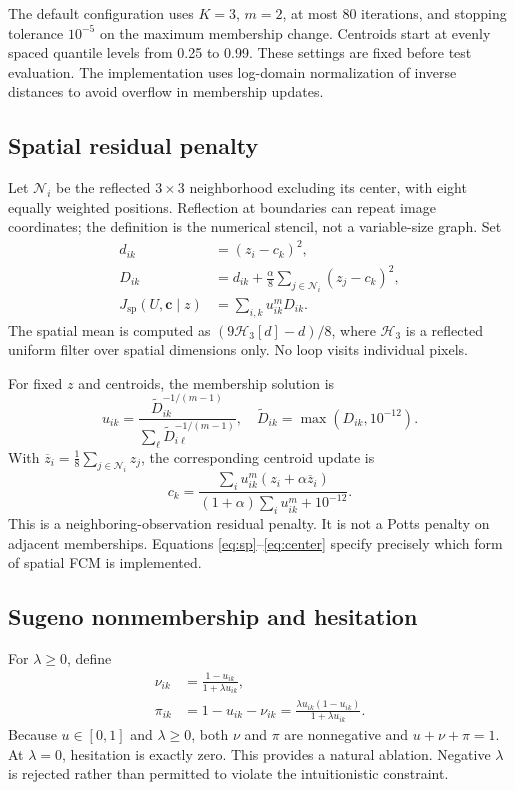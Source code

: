 \documentclass[conference]{IEEEtran}
\begin{document}
The default configuration uses $K=3$, $m=2$, at most 80 iterations, and stopping tolerance $10^{-5}$ on the maximum membership change. Centroids start at evenly spaced quantile levels from 0.25 to 0.99. These settings are fixed before test evaluation. The implementation uses log-domain normalization of inverse distances to avoid overflow in membership updates.

\subsection{Spatial residual penalty}
Let $\mathcal N_i$ be the reflected $3\times3$ neighborhood excluding its center, with eight equally weighted positions. Reflection at boundaries can repeat image coordinates; the definition is the numerical stencil, not a variable-size graph. Set
\begin{align}
 d_{ik}&=(z_i-c_k)^2,\\
 D_{ik}&=d_{ik}+\frac{\alpha}{8}\sum_{j\in\mathcal N_i}(z_j-c_k)^2,\\
 J_{\mathrm{sp}}(U,\boldsymbol c\mid z)&=
 \sum_{i,k}u_{ik}^{m}D_{ik}.\label{eq:sp}
\end{align}
The spatial mean is computed as $(9\mathcal H_3[d]-d)/8$, where $\mathcal H_3$ is a reflected uniform filter over spatial dimensions only. No loop visits individual pixels.

For fixed $z$ and centroids, the membership solution is
\begin{equation}
 u_{ik}=\frac{\widetilde D_{ik}^{-1/(m-1)}}
 {\sum_{\ell}\widetilde D_{i\ell}^{-1/(m-1)}},
 \quad\widetilde D_{ik}=\max(D_{ik},10^{-12}).
\end{equation}
With $\overline z_i=\frac18\sum_{j\in\mathcal N_i}z_j$, the corresponding centroid update is
\begin{equation}
 c_k=\frac{\sum_i u_{ik}^m(z_i+\alpha\overline z_i)}
 {(1+\alpha)\sum_i u_{ik}^m+10^{-12}}.\label{eq:center}
\end{equation}
This is a neighboring-observation residual penalty. It is not a Potts penalty on adjacent memberships. Equations \eqref{eq:sp}--\eqref{eq:center} specify precisely which form of spatial FCM is implemented.

\subsection{Sugeno nonmembership and hesitation}
For $\lambda\geq0$, define
\begin{align}
 \nu_{ik}&=\frac{1-u_{ik}}{1+\lambda u_{ik}},\\
 \pi_{ik}&=1-u_{ik}-\nu_{ik}
 =\frac{\lambda u_{ik}(1-u_{ik})}{1+\lambda u_{ik}}.\label{eq:sugeno}
\end{align}
Because $u\in[0,1]$ and $\lambda\geq0$, both $\nu$ and $\pi$ are nonnegative and $u+\nu+\pi=1$. At $\lambda=0$, hesitation is exactly zero. This provides a natural ablation. Negative $\lambda$ is rejected rather than permitted to violate the intuitionistic constraint.
\end{document}
